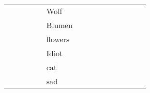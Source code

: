 \begin{center}
\begin{tabular}{lllllllllllllll}
       &            &                       &         &          &                  Wolf &                                         &                                         &                                                    &                                         &                                                    &                                         &                                         &          &        \\
       &            &                       &         &          &                Blumen &                                         &                                         &                                                    &                                         &                                                    &                                         &                                         &          &        \\
       &            &                       &         &          &               flowers &                                         &                                         &                                                    &                                         &                                                    &                                         &                                         &          &        \\
       &            &                       &         &          &                 Idiot &                                         &                                         &                                                    &                                         &                                                    &                                         &                                         &          &        \\
       &            &                       &         &          &                   cat &                                         &                                         &                                                    &                                         &                                                    &                                         &                                         &          &        \\
       &            &                       &         &          &                   sad &                                         &                                         &                                                    &                                         &                                                    &                                         &                                         &          &        \\

\end{tabular}
\end{center}
